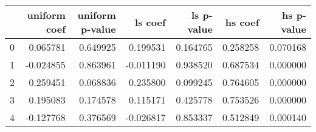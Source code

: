 \begin{tabular}{lrrrrrr}
\toprule
 & uniform coef & uniform p-value & ls coef & ls p-value & hs coef & hs p-value \\
\midrule
0 & 0.065781 & 0.649925 & 0.199531 & 0.164765 & 0.258258 & 0.070168 \\
1 & -0.024855 & 0.863961 & -0.011190 & 0.938520 & 0.687534 & 0.000000 \\
2 & 0.259451 & 0.068836 & 0.235800 & 0.099245 & 0.764605 & 0.000000 \\
3 & 0.195083 & 0.174578 & 0.115171 & 0.425778 & 0.753526 & 0.000000 \\
4 & -0.127768 & 0.376569 & -0.026817 & 0.853337 & 0.512849 & 0.000140 \\
\bottomrule
\end{tabular}
